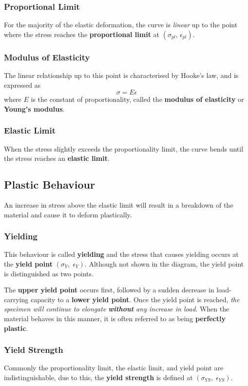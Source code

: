 \documentclass{article}
\begin{document}
\subsubsection{Proportional Limit}
For the majority of the elastic deformation, the curve is \textit{linear}
up to the point where the stress reaches the \textbf{proportional limit}
at \(\left( \sigma_{pl},\, \epsilon_{pl} \right)\).
\subsubsection{Modulus of Elasticity}
The linear relationship up to this point is characterised by Hooke's law, and is expressed as
\begin{equation*}
    \sigma = E \epsilon
\end{equation*}
where \(E\) is the constant of proportionality, called the \textbf{modulus of elasticity}
or \textbf{Young's modulus}.
\subsubsection{Elastic Limit}
When the stress slightly exceeds the proportionality limit,
the curve bends until the stress reaches an \textbf{elastic limit}.
\subsection{Plastic Behaviour}
An increase in stress above the elastic limit will result in a breakdown of the material
and cause it to deform plastically.
\subsubsection{Yielding}
This behaviour is called \textbf{yielding}
and the stress that causes yielding occurs at the \textbf{yield point}
\(\left( \sigma_{Y},\; \epsilon_{Y} \right)\).
Although not shown in the diagram, the yield point is distinguished as two points.

The \textbf{upper yield point} occurs first, followed by a sudden decrease in load-carrying capacity
to a \textbf{lower yield point}. Once the yield point is reached, \textit{the specimen will continue to
    elongate \textbf{without} any increase in load}. When the material behaves in this manner,
it is often referred to as being \textbf{perfectly plastic}.
\subsubsection{Yield Strength}
Commonly the proportionality limit, the elastic limit, and yield point are indistinguishable,
due to this, the \textbf{yield strength} is defined at \(\left( \sigma_{YS},\; \epsilon_{YS} \right)\).
\end{document}
